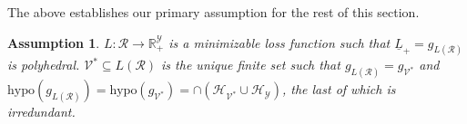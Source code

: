 \documentclass[twoside,11pt]{article}
\newcommand{\reals}{\mathbb{R}}
\renewcommand{\H}{\mathcal{H}}
\newcommand{\R}{\mathcal{R}}
\newcommand{\V}{\mathcal{V}}
\newcommand{\Y}{\mathcal{Y}}
\newcommand{\risk}[1]{\underline{#1}}
\newcommand{\hyp}{\mathrm{hypo}}
\newtheorem{assumption}{Assumption}
\begin{document}

%



The above establishes our primary assumption for the rest of this section.


\begin{assumption}\label{assum:V-star-exists-infinite}
	$L : \R \to \reals^\Y_+$ is a minimizable loss function such that $\risk L_+ = g_{L(\R)}$ is polyhedral.
	$\V^* \subseteq L(\R)$ is the unique finite set such that $g_{L(\R)} = g_{\V^*}$ and $\hyp(g_{L(\R)}) = \hyp(g_{\V^*}) = \cap(\H_{\V^*} \cup \H_\Y)$, the last of which is irredundant.
\end{assumption}
\end{document}
